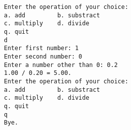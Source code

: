 \begin{frame}[fragile]
\begin{lstlisting}[backgroundcolor=\color{blue!20}]
Enter the operation of your choice:
a. add         b. substract
c. multiply    d. divide
q. quit
d
Enter first number: 1
Enter second number: 0
Enter a number other than 0: 0.2
1.00 / 0.20 = 5.00.
Enter the operation of your choice:
a. add         b. substract
c. multiply    d. divide
q. quit
q
Bye.
\end{lstlisting}
\end{frame}



